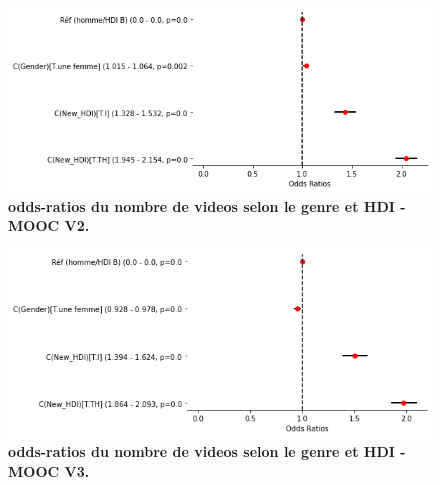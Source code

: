 \documentclass[12pt, a4paper, titlepage, table]{article}
\begin{document}
\begin{figure}[H]
	\centering
	\includegraphics[width=1\textwidth]{../../graph/forestplot_V1_poisson.png}
	\caption{\textbf{odds-ratios du nombre de videos selon le genre et HDI - MOOC V2.}}
\end{figure}

\begin{figure}[H]
	\centering
	\includegraphics[width=1\textwidth]{../../graph/forestplot_V2_poisson.png}
	\caption{\textbf{odds-ratios du nombre de videos selon le genre et HDI - MOOC V3.}}
\end{figure}
\end{document}
